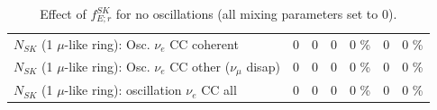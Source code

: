 \begin{table}
\begin{tabular}{| l | r | r | r  r | r  r |}
                          $N_{SK}$ (1 $\mu$-like ring): Osc. $\nu_e$ CC coherent &               0 &               0 &               0 &        0 \%  &               0 &        0 \%  \\ 
           $N_{SK}$ (1 $\mu$-like ring): Osc. $\nu_e$ CC other ($\nu_\mu$ disap) &               0 &               0 &               0 &        0 \%  &               0 &        0 \%  \\ 
                        $N_{SK}$ (1 $\mu$-like ring): oscillation $\nu_e$ CC all &               0 &               0 &               0 &        0 \%  &               0 &        0 \%  \\ 
\hline
\hline
\end{tabular}
\caption{ Effect of $f_{E; r}^{SK}$   for no oscillations (all mixing parameters set to 0). }
\label{tab:num_sk_energy_scale_1RmuT_3f_osc_t13:0_spectralreco_spectraltrue}
\end{table}
\clearpage
